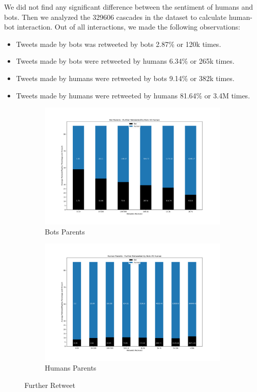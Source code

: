 \documentclass[letterpaper]{article}
\begin{document}
We did not find any significant difference between the sentiment of humans and bots. Then we analyzed the 329606 cascades in the dataset to calculate human-bot interaction. Out of all interactions, we made the following observations: 

\begin{itemize}
    \item Tweets made by bots was retweeted by bots 2.87\% or 120k times.
    \item Tweets made by bots were retweeted by humans 6.34\% or 265k times. 
    \item Tweets made by humans were retweeted by bots 9.14\% or 382k times. 
    \item Tweets made by humans were retweeted by humans 81.64\% or 3.4M times. 
\end{itemize}

\begin{figure}
    \centering
    \begin{subfigure}[b]{1\linewidth}
      \includegraphics[width=\linewidth]{images/bots_furtherretweeted.png}
      \caption{Bots Parents}
      \label{fig:further_retweet_bots}
    \end{subfigure}
    \begin{subfigure}[b]{1\linewidth}
      \includegraphics[width=\linewidth]{images/humans_furtherretweeted.png}
      \caption{Humans Parents}
      \label{fig:further_retweet_humans}
    \end{subfigure}
    \caption{Further Retweet}
    \label{fig:further_retweet}
\end{figure}
\end{document}
